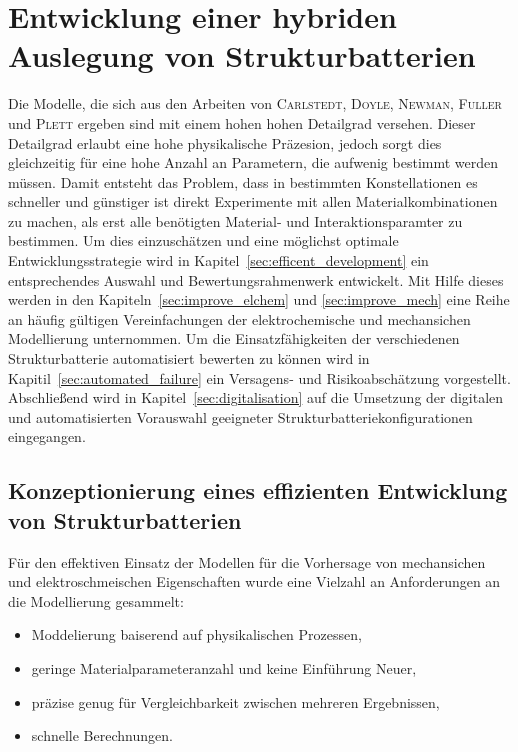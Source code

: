 \chapter{Entwicklung einer hybriden Auslegung von Strukturbatterien}
Die Modelle, die sich aus den Arbeiten von \textsc{Carlstedt}, \textsc{Doyle}, \textsc{Newman}, \textsc{Fuller} und \textsc{Plett} ergeben sind mit einem hohen hohen Detailgrad versehen. Dieser Detailgrad erlaubt eine hohe physikalische Präzesion, jedoch sorgt dies gleichzeitig für eine hohe Anzahl an Parametern, die aufwenig bestimmt werden müssen. Damit entsteht das Problem, dass in bestimmten Konstellationen es schneller und günstiger ist direkt Experimente mit allen Materialkombinationen zu machen, als erst alle benötigten Material- und Interaktionsparamter zu bestimmen. Um dies einzuschätzen und eine möglichst optimale Entwicklungsstrategie wird in Kapitel~\ref{sec:efficent_development} ein entsprechendes Auswahl und Bewertungsrahmenwerk entwickelt. Mit Hilfe dieses werden in den Kapiteln~\ref{sec:improve_elchem} und \ref{sec:improve_mech} eine Reihe an häufig gültigen Vereinfachungen der elektrochemische und mechansichen Modellierung unternommen. Um die Einsatzfähigkeiten der verschiedenen Strukturbatterie automatisiert bewerten zu können wird in Kapitil~\ref{sec:automated_failure} ein Versagens- und Risikoabschätzung vorgestellt. Abschließend wird in Kapitel~\ref{sec:digitalisation} auf die Umsetzung der digitalen und automatisierten Vorauswahl geeigneter Strukturbatteriekonfigurationen eingegangen.

\section{\label{sec:efficent_development}Konzeptionierung eines effizienten Entwicklung von Strukturbatterien}
Für den effektiven Einsatz der Modellen für die Vorhersage von mechansichen und elektroschmeischen Eigenschaften wurde eine Vielzahl an Anforderungen an die Modellierung gesammelt:
\begin{itemize}
    \item Moddelierung baiserend auf physikalischen Prozessen, %
    \item geringe Materialparameteranzahl und keine Einführung Neuer, %
    \item präzise genug für Vergleichbarkeit zwischen mehreren Ergebnissen, %
    \item schnelle Berechnungen. %
\end{itemize} 

